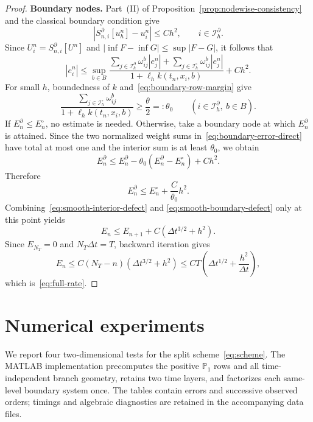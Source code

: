 \documentclass[11pt]{article}
\theoremstyle{definition}
\theoremstyle{remark}
\newcommand{\dt}{\Delta t}
\begin{document}
\begin{proof}
		\medskip
		\noindent\textbf{Boundary nodes.}
		Part~\textup{(II)} of Proposition~\ref{prop:nodewise-consistency} and the
		classical boundary condition give
		\begin{equation}
			\left|S_{n,i}^{\partial}[u_h^n]-u_i^n\right|\le Ch^2,
			\qquad i\in\mathcal I_h^\partial.
			\label{eq:boundary-exact-defect}
		\end{equation}
		Since $U_i^n=S_{n,i}^{\partial}[U^n]$ and
		$|\inf F-\inf G|\le\sup|F-G|$, it follows that
		\begin{equation}
			|e_i^n|\le
			\sup_{b\in B}
			\frac{\displaystyle\sum_{j\in\mathcal I_h^\partial}
				\omega_{ij}^b|e_j^n|
				+\displaystyle\sum_{j\in\mathcal I_h^\circ}
				\omega_{ij}^b|e_j^n|}
			{1+\ell_hk(t_n,x_i,b)}+Ch^2.
			\label{eq:boundary-error-direct}
		\end{equation}
		For small $h$, boundedness of $k$ and~\eqref{eq:boundary-row-margin} give
		\[
		\frac{\sum_{j\in\mathcal I_h^\circ}\omega_{ij}^b}
		{1+\ell_hk(t_n,x_i,b)}\ge\frac\theta2=: \theta_0
		\qquad(i\in\mathcal I_h^\partial,\ b\in B).
		\]
		If $E_n^\partial\le E_n^\circ$, no estimate is needed.  Otherwise, take a
		boundary node at which $E_n^\partial$ is attained.  Since the two normalized
		weight sums in~\eqref{eq:boundary-error-direct} have total at most one and
		the interior sum is at least $\theta_0$, we obtain
		\[
		E_n^\partial
		\le E_n^\partial-\theta_0(E_n^\partial-E_n^\circ)+Ch^2.
		\]
		Therefore
		\begin{equation}
			E_n^\partial\le E_n^\circ+\frac{C}{\theta_0}h^2.
			\label{eq:smooth-boundary-defect}
		\end{equation}
		Combining~\eqref{eq:smooth-interior-defect} and
		\eqref{eq:smooth-boundary-defect} only at this point yields
		\[
		E_n\le E_{n+1}+C(\dt^{3/2}+h^2).
		\]
		Since $E_{N_T}=0$ and $N_T\dt=T$, backward iteration gives
		\[
		E_n\le C(N_T-n)(\dt^{3/2}+h^2)
		\le CT\left(\dt^{1/2}+\frac{h^2}{\dt}\right),
		\]
		which is~\eqref{eq:full-rate}.
	\end{proof}
\section{Numerical experiments}
\label{sec:numerics}

We report four two-dimensional tests for the split scheme~\eqref{eq:scheme}.
The MATLAB implementation precomputes the positive $\mathbb P_1$ rows and all
time-independent branch geometry, retains two time layers, and factorizes each
same-level boundary system once.  The tables contain errors and successive
observed orders; timings and algebraic diagnostics are retained in the
accompanying data files.
\end{document}
